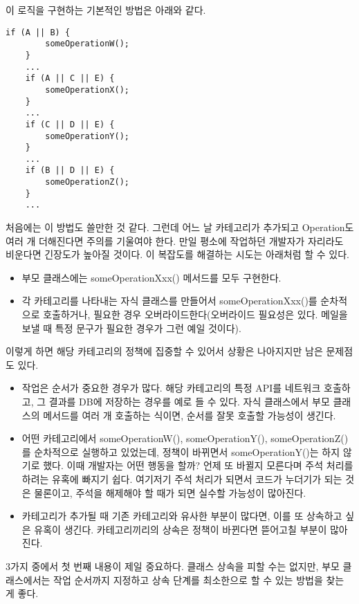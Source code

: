 이 로직을 구현하는 기본적인 방법은 아래와 같다.
\begin{lstlisting}[frame=single]
	if (A || B) { 
		someOperationW(); 
	}
	...
	if (A || C || E) { 
		someOperationX(); 
	}
	...
	if (C || D || E) { 
		someOperationY(); 
	} 
	...
	if (B || D || E) { 
		someOperationZ(); 
	}
	...
\end{lstlisting}
처음에는 이 방법도 쓸만한 것 같다.
그런데 어느 날 카테고리가 추가되고 Operation도 여러 개 더해진다면 주의를 기울여야 한다.
만일 평소에 작업하던 개발자가 자리라도 비운다면 긴장도가 높아질 것이다. 
이 복잡도를 해결하는 시도는 아래처럼 할 수 있다.
\begin{itemize}
\item 부모 클래스에는 someOperationXxx() 메서드를 모두 구현한다.
\item 각 카테고리를 나타내는 자식 클래스를 만들어서 someOperationXxx()를 순차적으로 호출하거나, 필요한 경우 오버라이드한다(오버라이드 필요성은 있다. 메일을 보낼 때 특정 문구가 필요한 경우가 그런 예일 것이다).
\end{itemize}

이렇게 하면 해당 카테고리의 정책에 집중할 수 있어서 상황은 나아지지만 남은 문제점도 있다.
\begin{itemize}
\item 작업은 순서가 중요한 경우가 많다. 해당 카테고리의 특정 API를 네트워크 호출하고, 그 결과를 DB에 저장하는 경우를 예로 들 수 있다.
자식 클래스에서 부모 클래스의 메서드를 여러 개 호출하는 식이면, 순서를 잘못 호출할 가능성이 생긴다.

\item 어떤 카테고리에서 someOperationW(), someOperationY(), someOperationZ()를 순차적으로 실행하고 있었는데, 정책이 바뀌면서 someOperationY()는 하지 않기로 했다. 이때 개발자는 어떤 행동을 할까? 
언제 또 바뀔지 모른다며 주석 처리를 하려는 유혹에 빠지기 쉽다. 여기저기 주석 처리가 되면서 코드가 누더기가 되는 것은 물론이고, 주석을 해제해야 할 때가 되면 실수할 가능성이 많아진다.

\item 카테고리가 추가될 때 기존 카테고리와 유사한 부분이 많다면, 이를 또 상속하고 싶은 유혹이 생긴다.
카테고리끼리의 상속은 정책이 바뀐다면 뜯어고칠 부분이 많아진다.
 
\end{itemize}

3가지 중에서 첫 번째 내용이 제일 중요하다. 
클래스 상속을 피할 수는 없지만, 부모 클래스에서는 작업 순서까지 지정하고 상속 단계를 최소한으로 할 수 있는 방법을 찾는 게 좋다.\\

